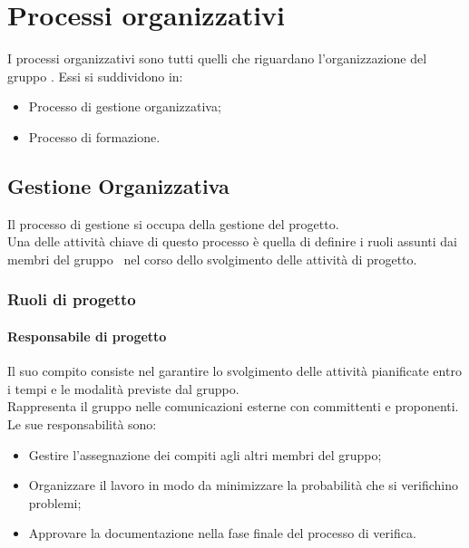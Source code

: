 \section{Processi organizzativi}\label{section:processi_organizzativi}
  I processi organizzativi sono tutti quelli che riguardano l'organizzazione del gruppo \groupName. Essi si suddividono in:
  \begin{itemize}
    \item Processo di gestione organizzativa;
    \item Processo di formazione.
  \end{itemize}

  \subsection{Gestione Organizzativa} \label{subsection:gestione_organizzativa}



    Il processo di gestione si occupa della gestione del progetto.\\
    Una delle attività chiave di questo processo è quella di definire i ruoli assunti dai membri del gruppo \groupName\ nel corso dello svolgimento delle attività di progetto.
    
    \subsubsection{Ruoli di progetto}

      \paragraph{Responsabile di progetto}
      Il suo compito consiste nel garantire lo svolgimento delle attività pianificate entro i tempi e le modalità previste dal gruppo.\\
        Rappresenta il gruppo nelle comunicazioni esterne con committenti e proponenti.\\
        Le sue responsabilità sono:
        \begin{itemize}
          \item Gestire l'assegnazione dei compiti agli altri membri del gruppo;
          \item Organizzare il lavoro in modo da minimizzare la probabilità che si verifichino problemi;
          \item Approvare la documentazione nella fase finale del processo di verifica.
        \end{itemize}

